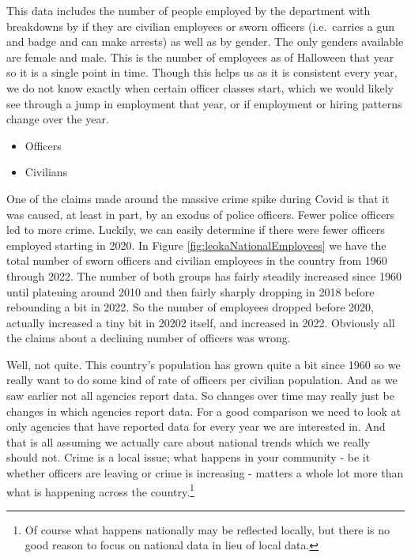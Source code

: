 \documentclass[
]{krantz}
\providecommand{\tightlist}{%
  \setlength{\itemsep}{0pt}\setlength{\parskip}{0pt}}
\begin{document}
This data includes the number of people employed by the
department with breakdowns by if they are civilian employees
or sworn officers (i.e.~carries a gun and badge and can make
arrests) as well as by gender. The only genders available
are female and male. This is the number of employees as of
Halloween that year so it is a single point in time. Though
this helps us as it is consistent every year, we do not know
exactly when certain officer classes start, which we would
likely see through a jump in employment that year, or if
employment or hiring patterns change over the year.

\begin{itemize}
\tightlist
\item
  Officers
\item
  Civilians
\end{itemize}

One of the claims made around the massive crime spike during
Covid is that it was caused, at least in part, by an exodus
of police officers. Fewer police officers led to more crime.
Luckily, we can easily determine if there were fewer
officers employed starting in 2020. In Figure
\ref{fig:leokaNationalEmployees} we have the total number of
sworn officers and civilian employees in the country from
1960 through 2022. The number of both groups has fairly
steadily increased since 1960 until plateuing around 2010
and then fairly sharply dropping in 2018 before rebounding a
bit in 2022. So the number of employees dropped before 2020,
actually increased a tiny bit in 20202 itself, and increased
in 2022. Obviously all the claims about a declining number
of officers was wrong.

Well, not quite. This country's population has grown quite a
bit since 1960 so we really want to do some kind of rate of
officers per civilian population. And as we saw earlier not
all agencies report data. So changes over time may really
just be changes in which agencies report data. For a good
comparison we need to look at only agencies that have
reported data for every year we are interested in. And that
is all assuming we actually care about national trends which
we really should not. Crime is a local issue; what happens
in your community - be it whether officers are leaving or
crime is increasing - matters a whole lot more than what is
happening across the country.\footnote{Of course what
  happens nationally may be reflected locally, but there is
  no good reason to focus on national data in lieu of local
  data.}
\end{document}
